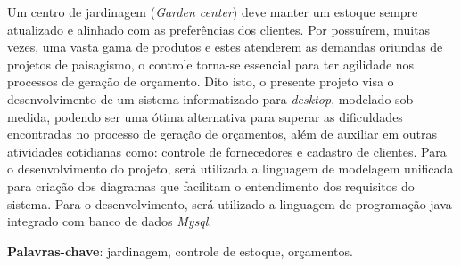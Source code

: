 \setlength{\absparsep}{18pt} %
\begin{resumo}
	Um centro de jardinagem (\textit{Garden center}) deve manter um estoque sempre atualizado e alinhado com as preferências dos clientes. Por possuírem, muitas vezes, uma vasta gama de produtos e estes atenderem as demandas oriundas de projetos de paisagismo, o controle torna-se essencial para ter agilidade nos processos de geração de orçamento. 
    Dito isto, o presente projeto visa o desenvolvimento de um sistema informatizado para \textit {desktop}, modelado sob medida, podendo ser uma ótima alternativa para superar as dificuldades encontradas no processo de geração de orçamentos, além de auxiliar em outras atividades cotidianas como: controle de fornecedores e cadastro de clientes.
    Para o desenvolvimento do projeto, será utilizada a linguagem de modelagem unificada para criação dos diagramas que facilitam o entendimento dos requisitos do sistema. Para o desenvolvimento, será utilizado a linguagem de programação java integrado com banco de dados \textit{Mysql}.

	
	
	\textbf{Palavras-chave}: jardinagem, controle de estoque, orçamentos. 
\end{resumo}


